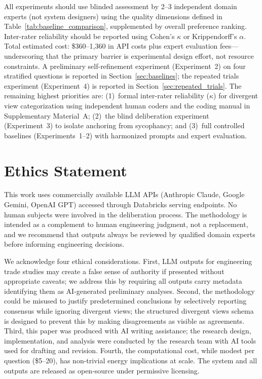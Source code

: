 \documentclass[11pt,a4paper]{article}
\begin{document}
All experiments should use blinded assessment by 2--3 independent domain experts (not system designers) using the quality dimensions defined in Table~\ref{tab:baseline_comparison}, supplemented by overall preference ranking. Inter-rater reliability should be reported using Cohen's $\kappa$ or Krippendorff's $\alpha$. Total estimated cost: \$360--1{,}360 in API costs plus expert evaluation fees---underscoring that the primary barrier is experimental design effort, not resource constraints. A preliminary self-refinement experiment (Experiment~2) on four stratified questions is reported in Section~\ref{sec:baselines}; the repeated trials experiment (Experiment~4) is reported in Section~\ref{sec:repeated_trials}. The remaining highest priorities are: (1)~formal inter-rater reliability ($\kappa$) for divergent view categorization using independent human coders and the coding manual in Supplementary Material~A; (2)~the blind deliberation experiment (Experiment~3) to isolate anchoring from sycophancy; and (3)~full controlled baselines (Experiments~1--2) with harmonized prompts and expert evaluation.

\section{Ethics Statement}
\label{sec:ethics}

This work uses commercially available LLM APIs (Anthropic Claude, Google Gemini, OpenAI GPT) accessed through Databricks serving endpoints. No human subjects were involved in the deliberation process. The methodology is intended as a complement to human engineering judgment, not a replacement, and we recommend that outputs always be reviewed by qualified domain experts before informing engineering decisions.

We acknowledge four ethical considerations. First, LLM outputs for engineering trade studies may create a false sense of authority if presented without appropriate caveats; we address this by requiring all outputs carry metadata identifying them as AI-generated preliminary analyses. Second, the methodology could be misused to justify predetermined conclusions by selectively reporting consensus while ignoring divergent views; the structured divergent views schema is designed to prevent this by making disagreements as visible as agreements. Third, this paper was produced with AI writing assistance; the research design, implementation, and analysis were conducted by the research team with AI tools used for drafting and revision. Fourth, the computational cost, while modest per question (\$5--20), has non-trivial energy implications at scale. The system and all outputs are released as open-source under permissive licensing.
\end{document}
